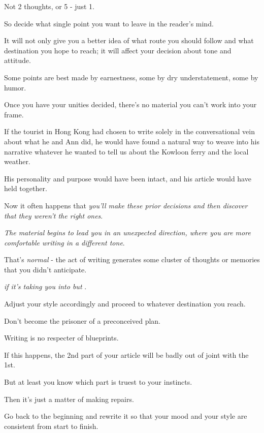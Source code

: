 \documentclass{book}
\numberwithin{equation}{section}
\begin{document}
Not 2 thoughts, or 5 - just 1.

So decide what single point you want to leave in the reader's mind.

It will not only give you a better idea of what route you should follow and what destination you hope to reach; it will affect your decision about tone and attitude.

Some points are best made by earnestness, some by dry understatement, some by humor.

%
Once you have your unities decided, there's no material you can't work into your frame.

If the tourist in Hong Kong had chosen to write solely in the conversational vein about what he and Ann did, he would have found a natural way to weave into his narrative whatever he wanted to tell us about the Kowloon ferry and the local weather.

His personality and purpose would have been intact, and his article would have held together.

%
Now it often happens that \textit{you'll make these prior decisions and then discover that they weren't the right ones}.

\textit{The material begins to lead you in an unexpected direction, where you are more comfortable writing in a different tone}.

That's \textit{normal} - the act of writing generates some cluster of thoughts or memories that you didn't anticipate.


\textit{ if it's taking you into  but }.

Adjust your style accordingly and proceed to whatever destination you reach.

Don't become the prisoner of a preconceived plan.

Writing is no respecter of blueprints.

If this happens, the 2nd part of your article will be badly out of joint with the 1st.

But at least you know which part is truest to your instincts.

Then it's just a matter of making repairs.

Go back to the beginning and rewrite it so that your mood and your style are consistent from start to finish.
\end{document}

